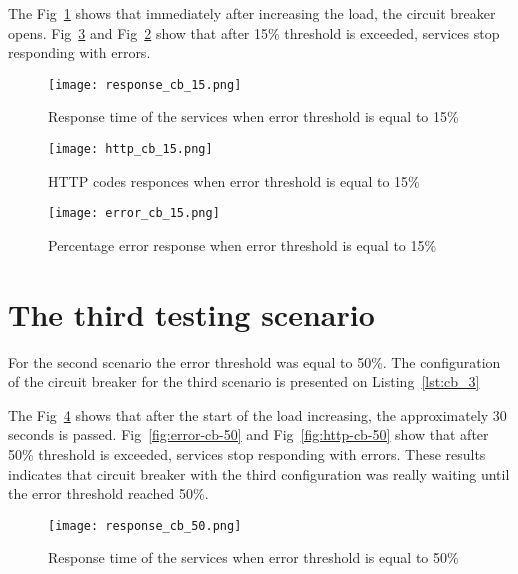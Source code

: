 The Fig~\ref{fig:response-cb-15} shows that immediately after increasing the load, the circuit breaker opens.
Fig~\ref{fig:error-cb-15} and Fig~\ref{fig:http-cb-15} show that after 15\% threshold is exceeded, services stop responding with errors.

\begin{figure}[t]
    \centering
    \texttt{[image: response\_cb\_15.png]}
    \caption{Response time of the services when error threshold is equal to 15\%}
    \label{fig:response-cb-15}
\end{figure}
\begin{figure}[t]
    \centering
    \texttt{[image: http\_cb\_15.png]}
    \caption{HTTP codes responces when error threshold is equal to 15\%}
    \label{fig:http-cb-15}
\end{figure}
\begin{figure}[t]
    \centering
    \texttt{[image: error\_cb\_15.png]}
    \caption{Percentage error response when error threshold is equal to 15\%}
    \label{fig:error-cb-15}
\end{figure}

\section{The third testing scenario}\label{sec:test_description_3}
For the second scenario the error threshold was equal to 50\%.
The configuration of the circuit breaker for the third scenario is presented on Listing~\ref{lst:cb_3}

\begin{flushright}
\begin{minipage}{\textwidth}

\end{minipage}
\end{flushright}

The Fig~\ref{fig:response-cb-50} shows that after the start of the load increasing, the approximately 30 seconds is passed.
Fig~\ref{fig:error-cb-50} and Fig~\ref{fig:http-cb-50} show that after 50\% threshold is exceeded, services stop responding with errors. These results indicates that circuit breaker with the third configuration was really waiting until the error threshold reached 50\%.
\begin{figure}[t]
    \centering
    \texttt{[image: response\_cb\_50.png]}
    \caption{Response time of the services when error threshold is equal to 50\%}
    \label{fig:response-cb-50}
\end{figure}

